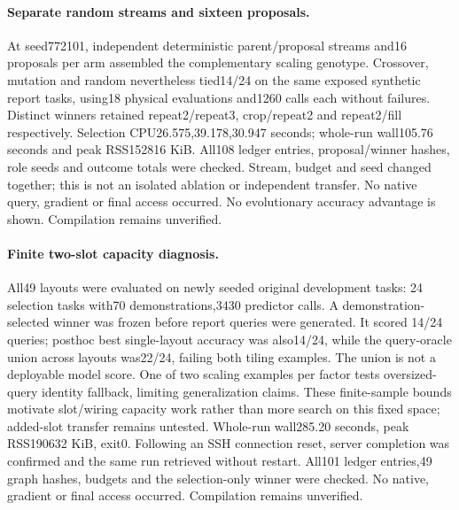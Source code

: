 \documentclass[11pt]{article}
\begin{document}
\paragraph{Separate random streams and sixteen proposals.}
At seed772101, independent deterministic parent/proposal streams and16 proposals
per arm assembled the complementary scaling genotype. Crossover, mutation and
random nevertheless tied14/24 on the same exposed synthetic report tasks,
using18 physical evaluations and1260 calls each without failures. Distinct
winners retained repeat2/repeat3, crop/repeat2 and repeat2/fill respectively.
Selection CPU26.575,39.178,30.947 seconds; whole-run wall105.76 seconds and
peak RSS152816 KiB. All108 ledger entries, proposal/winner hashes, role seeds
and outcome totals were checked. Stream, budget and seed changed together;
this is not an isolated ablation or independent transfer. No native query,
gradient or final access occurred. No evolutionary accuracy advantage is shown.
Compilation remains unverified.
\paragraph{Finite two-slot capacity diagnosis.}
All49 layouts were evaluated on newly seeded original development tasks:
24 selection tasks with70 demonstrations,3430 predictor calls. A demonstration-
selected winner was frozen before report queries were generated. It scored
14/24 queries; posthoc best single-layout accuracy was also14/24, while the
query-oracle union across layouts was22/24, failing both tiling examples.
The union is not a deployable model score. One of two scaling examples per factor
tests oversized-query identity fallback, limiting generalization claims.
These finite-sample bounds motivate slot/wiring capacity work rather than more
search on this fixed space; added-slot transfer remains untested. Whole-run
wall285.20 seconds, peak RSS190632 KiB, exit0. Following an SSH connection
reset, server completion was confirmed and the same run retrieved without
restart. All101 ledger entries,49 graph hashes, budgets and the selection-only
winner were checked. No native, gradient or final access occurred. Compilation
remains unverified.
\end{document}
